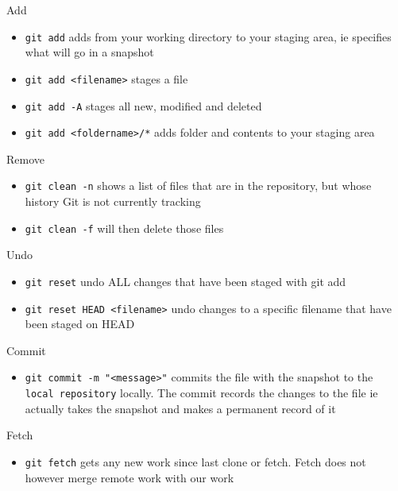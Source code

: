 \documentclass[
]{book}
\providecommand{\tightlist}{%
  \setlength{\itemsep}{0pt}\setlength{\parskip}{0pt}}
\begin{document}
Add

\begin{itemize}
\tightlist
\item
  \texttt{git\ add} adds from your working directory to your staging area, ie specifies what will go in a snapshot
\item
  \texttt{git\ add\ \textless{}filename\textgreater{}} stages a file
\item
  \texttt{git\ add\ -A} stages all new, modified and deleted
\item
  \texttt{git\ add\ \textless{}foldername\textgreater{}/*} adds folder and contents to your staging area
\end{itemize}

Remove

\begin{itemize}
\tightlist
\item
  \texttt{git\ clean\ -n} shows a list of files that are in the repository, but whose history Git is not currently tracking
\item
  \texttt{git\ clean\ -f} will then delete those files
\end{itemize}

Undo

\begin{itemize}
\tightlist
\item
  \texttt{git\ reset} undo ALL changes that have been staged with git add
\item
  \texttt{git\ reset\ HEAD\ \textless{}filename\textgreater{}} undo changes to a specific filename that have been staged on HEAD
\end{itemize}

Commit

\begin{itemize}
\tightlist
\item
  \texttt{git\ commit\ -m\ "\textless{}message\textgreater{}"} commits the file with the snapshot to the \texttt{local\ repository} locally. The commit records the changes to the file ie actually takes the snapshot and makes a permanent record of it
\end{itemize}

Fetch

\begin{itemize}
\tightlist
\item
  \texttt{git\ fetch} gets any new work since last clone or fetch. Fetch does not however merge remote work with our work
\end{itemize}
\end{document}
